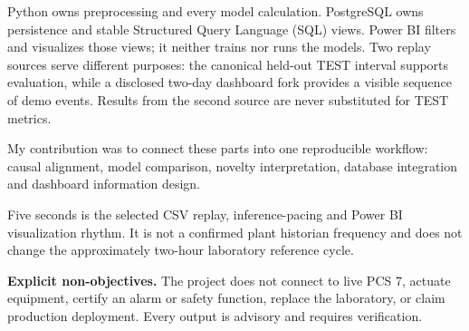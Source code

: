 Python owns preprocessing and every model calculation. PostgreSQL owns persistence and stable Structured Query Language (SQL) views. Power BI filters and visualizes those views; it neither trains nor runs the models. Two replay sources serve different purposes: the canonical held-out TEST interval supports evaluation, while a disclosed two-day dashboard fork provides a visible sequence of demo events. Results from the second source are never substituted for TEST metrics.

My contribution was to connect these parts into one reproducible workflow: causal alignment, model comparison, novelty interpretation, database integration and dashboard information design.

\begin{engineeringbox}
Five seconds is the selected CSV replay, inference-pacing and Power BI visualization rhythm. It is not a confirmed plant historian frequency and does not change the approximately two-hour laboratory reference cycle.
\end{engineeringbox}

\noindent\textbf{Explicit non-objectives.} The project does not connect to live PCS 7, actuate equipment, certify an alarm or safety function, replace the laboratory, or claim production deployment. Every output is advisory and requires verification.

